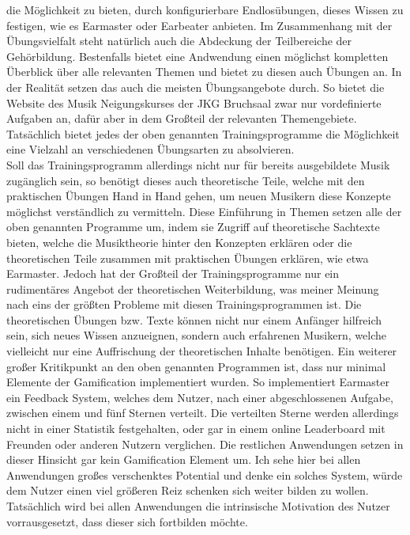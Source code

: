 die Möglichkeit zu bieten, durch konfigurierbare Endlosübungen, dieses Wissen zu festigen, wie es Earmaster  oder Earbeater anbieten. Im Zusammenhang mit der Übungsvielfalt steht natürlich auch die Abdeckung der Teilbereiche der Gehörbildung. Bestenfalls bietet eine Andwendung einen möglichst kompletten Überblick 
über alle relevanten Themen und bietet zu diesen auch Übungen an. In der Realität setzen das auch die meisten Übungsangebote durch. So bietet die Website des Musik Neigungskurses der JKG Bruchsaal zwar nur vordefinierte Aufgaben an, dafür aber in dem Großteil der relevanten Themengebiete. Tatsächlich bietet jedes der oben genannten Trainingsprogramme
die Möglichkeit eine Vielzahl an verschiedenen Übungsarten zu absolvieren.  \\
Soll das Trainingsprogramm allerdings nicht nur für bereits ausgebildete Musik zugänglich sein, so benötigt dieses auch theoretische Teile, welche mit den praktischen Übungen Hand in Hand gehen, um neuen Musikern diese Konzepte möglichst verständlich zu vermitteln. Diese Einführung in Themen setzen alle der oben genannten Programme um, indem sie Zugriff auf theoretische Sachtexte bieten, welche
die Musiktheorie hinter den Konzepten erklären oder die theoretischen Teile zusammen mit praktischen Übungen erklären, wie etwa Earmaster. Jedoch hat der Großteil der Trainingsprogramme nur ein rudimentäres Angebot der theoretischen Weiterbildung, was meiner Meinung nach eins der größten Probleme mit diesen Trainingsprogrammen ist. Die theoretischen 
Übungen bzw. Texte können nicht nur einem Anfänger hilfreich sein, sich neues Wissen anzueignen, sondern auch erfahrenen Musikern, welche vielleicht nur eine Auffrischung der theoretischen Inhalte benötigen. Ein weiterer großer Kritikpunkt an den oben genannten Programmen ist, dass nur minimal Elemente der Gamification implementiert wurden. So implementiert Earmaster ein Feedback System, 
welches dem Nutzer, nach einer abgeschlossenen Aufgabe, zwischen einem und fünf Sternen verteilt. Die verteilten Sterne werden allerdings nicht in einer Statistik festgehalten, oder gar in einem online Leaderboard mit Freunden oder anderen Nutzern verglichen. Die restlichen Anwendungen setzen in dieser Hinsicht gar kein Gamification Element um. Ich sehe hier bei allen Anwendungen großes verschenktes Potential und denke 
ein solches System, würde dem Nutzer einen viel größeren Reiz schenken sich weiter bilden zu wollen. Tatsächlich wird bei allen Anwendungen die intrinsische Motivation des Nutzer vorrausgesetzt, dass dieser sich fortbilden möchte. \\ 
